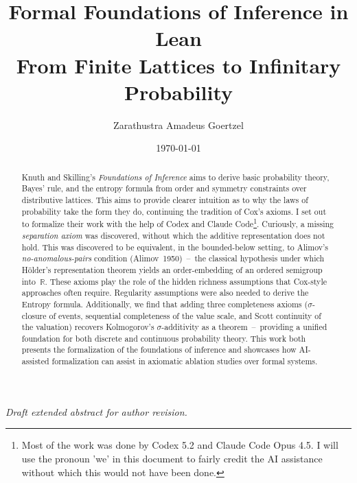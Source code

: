 \documentclass[11pt]{article}
\title{Formal Foundations of Inference in Lean\\From Finite Lattices to Infinitary Probability}
\author{Zarathustra Amadeus Goertzel}
\date{\today}
\theoremstyle{definition}
\theoremstyle{remark}
\newcommand{\R}{\ensuremath{\mathbb{R}}}
\newcommand{\draftnote}{\noindent\textit{Draft extended abstract for author revision.}}
\begin{document}
\maketitle
\draftnote

\begin{abstract}
Knuth and Skilling's \emph{Foundations of Inference} aims to derive basic probability theory, Bayes' rule, and the entropy formula from order and symmetry constraints over distributive lattices.
This aims to provide clearer intuition as to why the laws of probability take the form they do, continuing the tradition of Cox's axioms.
I set out to formalize their work with the help of Codex and Claude Code\footnote{Most of the work was done by Codex 5.2 and Claude Code Opus 4.5.  I will use the pronoun 'we' in this document to fairly credit the AI assistance without which this would not have been done.}.
Curiously, a missing \emph{separation axiom} was discovered, without which the additive representation does not hold.
This was discovered to be equivalent, in the bounded-below setting, to Alimov's \emph{no-anomalous-pairs} condition (Alimov~1950)~--~the classical hypothesis under which Hölder's representation theorem yields an order-embedding of an ordered semigroup into~$\R$. %
These axioms play the role of the hidden richness assumptions that Cox-style approaches often require.
Regularity assumptions were also needed to derive the Entropy formula.
Additionally, we find that adding three completeness axioms ($\sigma$-closure of events, sequential completeness of the value scale, and Scott continuity of the valuation) recovers Kolmogorov's $\sigma$-additivity as a theorem~--~providing a unified foundation for both discrete and continuous probability theory. %
This work both presents the formalization of the foundations of inference and showcases how AI-assisted formalization can assist in axiomatic ablation studies over formal systems. %


\end{abstract}
\end{document}
